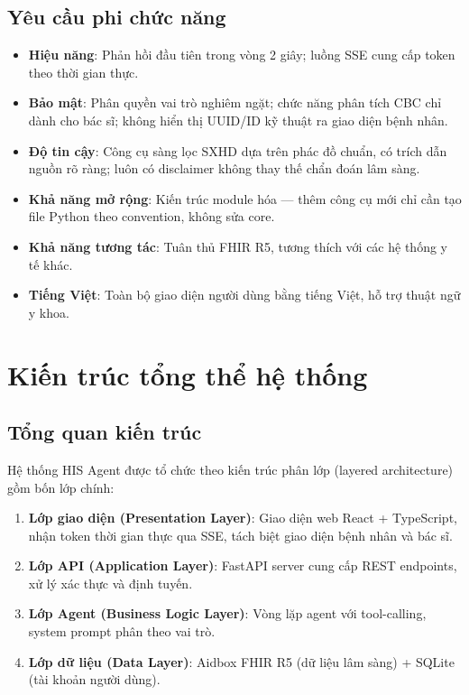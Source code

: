 \documentclass[a4paper,13pt,3p,twoside,openany]{report}
\theoremstyle{definition}
\theoremstyle{remark}
\theoremstyle{definition}
\let\ORIGsection\section
\let\ORIGsubsection\subsection
\renewcommand{\section}{\needspace{3\baselineskip}\ORIGsection}
\renewcommand{\subsection}{\needspace{3\baselineskip}\ORIGsubsection}
\begin{document}
\subsection{Yêu cầu phi chức năng}

\noindent\begin{minipage}{\linewidth}
\begin{itemize}
  \item \textbf{Hiệu năng}: Phản hồi đầu tiên trong vòng 2 giây; luồng SSE cung cấp token theo thời gian thực.
  \item \textbf{Bảo mật}: Phân quyền vai trò nghiêm ngặt; chức năng phân tích CBC chỉ dành cho bác sĩ; không hiển thị UUID/ID kỹ thuật ra giao diện bệnh nhân.
  \item \textbf{Độ tin cậy}: Công cụ sàng lọc SXHD dựa trên phác đồ chuẩn, có trích dẫn nguồn rõ ràng; luôn có disclaimer không thay thế chẩn đoán lâm sàng.
  \item \textbf{Khả năng mở rộng}: Kiến trúc module hóa --- thêm công cụ mới chỉ cần tạo file Python theo convention, không sửa core.
  \item \textbf{Khả năng tương tác}: Tuân thủ FHIR R5, tương thích với các hệ thống y tế khác.
  \item \textbf{Tiếng Việt}: Toàn bộ giao diện người dùng bằng tiếng Việt, hỗ trợ thuật ngữ y khoa.
\end{itemize}
\end{minipage}

\section{Kiến trúc tổng thể hệ thống}

\subsection{Tổng quan kiến trúc}

Hệ thống HIS Agent được tổ chức theo kiến trúc phân lớp (layered architecture) gồm bốn lớp chính:

\begin{enumerate}
  \item \textbf{Lớp giao diện (Presentation Layer)}: Giao diện web React + TypeScript, nhận token thời gian thực qua SSE, tách biệt giao diện bệnh nhân và bác sĩ.
  \item \textbf{Lớp API (Application Layer)}: FastAPI server cung cấp REST endpoints, xử lý xác thực và định tuyến.
  \item \textbf{Lớp Agent (Business Logic Layer)}: Vòng lặp agent với tool-calling, system prompt phân theo vai trò.
  \item \textbf{Lớp dữ liệu (Data Layer)}: Aidbox FHIR R5 (dữ liệu lâm sàng) + SQLite (tài khoản người dùng).
\end{enumerate}
\end{document}
